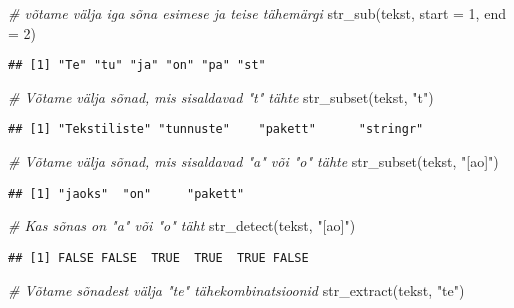 \documentclass[
]{book}
\newenvironment{Shaded}{\begin{snugshade}}{\end{snugshade}}
\newcommand{\AttributeTok}[1]{\textcolor[rgb]{0.77,0.63,0.00}{#1}}
\newcommand{\CommentTok}[1]{\textcolor[rgb]{0.56,0.35,0.01}{\textit{#1}}}
\newcommand{\DecValTok}[1]{\textcolor[rgb]{0.00,0.00,0.81}{#1}}
\newcommand{\FunctionTok}[1]{\textcolor[rgb]{0.00,0.00,0.00}{#1}}
\newcommand{\NormalTok}[1]{#1}
\newcommand{\StringTok}[1]{\textcolor[rgb]{0.31,0.60,0.02}{#1}}
\begin{document}
\begin{Shaded}
\begin{Highlighting}[]
\CommentTok{\# võtame välja iga sõna esimese ja teise tähemärgi}
\FunctionTok{str\_sub}\NormalTok{(tekst, }\AttributeTok{start =} \DecValTok{1}\NormalTok{, }\AttributeTok{end =} \DecValTok{2}\NormalTok{)}
\end{Highlighting}
\end{Shaded}

\begin{verbatim}
## [1] "Te" "tu" "ja" "on" "pa" "st"
\end{verbatim}

\begin{Shaded}
\begin{Highlighting}[]
\CommentTok{\# Võtame välja sõnad, mis sisaldavad "t" tähte}
\FunctionTok{str\_subset}\NormalTok{(tekst, }\StringTok{"t"}\NormalTok{)}
\end{Highlighting}
\end{Shaded}

\begin{verbatim}
## [1] "Tekstiliste" "tunnuste"    "pakett"      "stringr"
\end{verbatim}

\begin{Shaded}
\begin{Highlighting}[]
\CommentTok{\# Võtame välja sõnad, mis sisaldavad "a" või "o" tähte}
\FunctionTok{str\_subset}\NormalTok{(tekst, }\StringTok{"[ao]"}\NormalTok{)}
\end{Highlighting}
\end{Shaded}

\begin{verbatim}
## [1] "jaoks"  "on"     "pakett"
\end{verbatim}

\begin{Shaded}
\begin{Highlighting}[]
\CommentTok{\# Kas sõnas on "a" või "o" täht}
\FunctionTok{str\_detect}\NormalTok{(tekst, }\StringTok{"[ao]"}\NormalTok{)}
\end{Highlighting}
\end{Shaded}

\begin{verbatim}
## [1] FALSE FALSE  TRUE  TRUE  TRUE FALSE
\end{verbatim}

\begin{Shaded}
\begin{Highlighting}[]
\CommentTok{\# Võtame sõnadest välja "te" tähekombinatsioonid}
\FunctionTok{str\_extract}\NormalTok{(tekst, }\StringTok{"te"}\NormalTok{)}
\end{Highlighting}
\end{Shaded}
\end{document}
